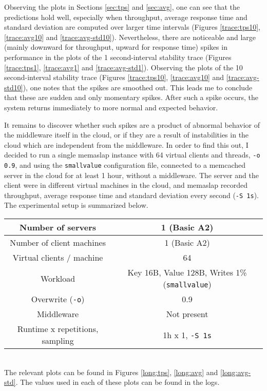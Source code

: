 \documentclass[11pt]{article}
\begin{document}
Observing the plots in Sections \ref{sec:tps} and \ref{sec:avg}, one can see that the predictions hold well, especially when throughput, average response time and standard deviation are computed over larger time intervals (Figures \ref{trace:tps10}, \ref{trace:avg10} and \ref{trace:avg-std10}). Nevertheless, there are noticeable and large (mainly downward for throughput, upward for response time) spikes in performance in the plots of the 1 second-interval stability trace (Figures \ref{trace:tps1}, \ref{trace:avg1} and \ref{trace:avg-std1}). Observing the plots of the 10 second-interval stability trace (Figures \ref{trace:tps10}, \ref{trace:avg10} and \ref{trace:avg-std10}), one notes that the spikes are smoothed out. This leads me to conclude that these are sudden and only momentary spikes. After such a spike occurs, the system returns immediately to more normal and expected behavior.

It remains to discover whether such spikes are a product of abnormal behavior of the middleware itself in the cloud, or if they are a result of instabilities in the cloud which are independent from the middleware. In order to find this out, I decided to run a single memaslap instance with 64 virtual clients and threads, \texttt{-o 0.9}, and using the \texttt{smallvalue} configuration file, connected to a memcached server in the cloud for at least 1 hour, without a middleware. The server and the client were in different virtual machines in the cloud, and memaslap recorded throughput, average response time and standard deviation every second (\texttt{-S 1s}). The experimental setup is summarized below.

\small{
	\smallskip
	\begin{tabular}{|c|c|}
		\hline Number of servers & 1 (Basic A2) \\ 
		\hline Number of client machines & 1 (Basic A2) \\ 
		\hline Virtual clients / machine & 64 \\ 
		\hline Workload & Key 16B, Value 128B, Writes 1\% (\texttt{smallvalue}) \\
		\hline Overwrite (\texttt{-o}) & 0.9\\
		\hline Middleware & Not present\\ 
		\hline Runtime x repetitions, sampling & 1h x 1, \texttt{-S 1s} \\
		\hline
	\end{tabular} }\\

The relevant plots can be found in Figures \ref{long:tps}, \ref{long:avg} and \ref{long:avg-std}. The values used in each of these plots can be found in the logs.
\end{document}
